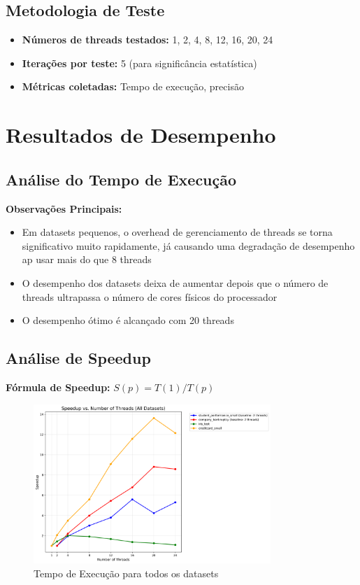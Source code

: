 \documentclass[a4paper,11pt]{article}
\begin{document}
\subsection{Metodologia de Teste}
\begin{itemize}
    \item \textbf{Números de threads testados:} 1, 2, 4, 8, 12, 16, 20, 24
    \item \textbf{Iterações por teste:} 5 (para significância estatística)
    \item \textbf{Métricas coletadas:} Tempo de execução, precisão
\end{itemize}

\section{Resultados de Desempenho}

\subsection{Análise do Tempo de Execução}







\textbf{Observações Principais:}
\begin{itemize}
    \item Em datasets pequenos, o overhead de gerenciamento de threads se torna significativo muito rapidamente, já causando uma degradação de desempenho ap usar mais do que 8 threads
    \item O desempenho dos datasets deixa de aumentar depois que o número de threads ultrapassa o número de cores físicos do processador
    \item O desempenho ótimo é alcançado com 20 threads
\end{itemize}

\subsection{Análise de Speedup}

\textbf{Fórmula de Speedup:} $S(p) = T(1) / T(p)$

\begin{figure}[H]
    \centering
    \includegraphics[width=0.8\textwidth]{../../pcad_results/graphs/all_datasets_speedup.png}
    \caption{Tempo de Execução para todos os datasets}
\end{figure}
\end{document}
